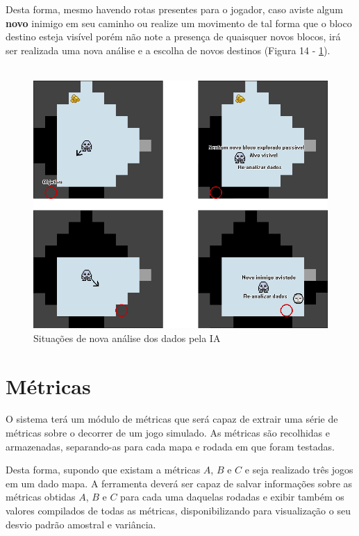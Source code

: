 Desta forma, mesmo havendo rotas presentes para o jogador, caso aviste algum \textbf{novo} inimigo em seu caminho ou realize um movimento de tal forma que o bloco destino esteja visível porém não note a presença de quaisquer novos blocos, irá ser realizada uma nova análise e a escolha de novos destinos (Figura 14 - \ref{fig14}). 
\\\\
\begin{figure}[h]
	\centering
	\label{fig14}
		\includegraphics[keepaspectratio=true,scale=0.5]{figuras/fig14-bot3.png}
	\caption{Situações de nova análise dos dados pela IA}
\end{figure}

\section{Métricas}

O sistema terá um módulo de métricas que será capaz de extrair uma série de métricas sobre o decorrer de um jogo simulado. 
As métricas são recolhidas e armazenadas, separando-as para cada mapa e rodada em que foram testadas. 

Desta forma, supondo que existam a métricas $A$, $B$ e $C$ e seja realizado três jogos em um dado mapa.
A ferramenta deverá ser capaz de salvar informações sobre as métricas obtidas $A$, $B$ e $C$ para cada uma daquelas rodadas e exibir também os valores compilados de todas as métricas, disponibilizando para visualização o seu desvio padrão amostral e variância.

